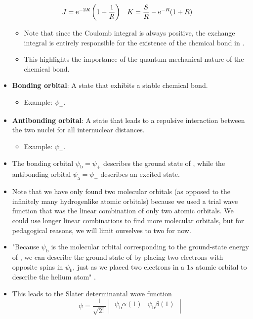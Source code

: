 \documentclass[../notes.tex]{subfiles}
\begin{document}
\begin{itemize}
\begin{align*}
        J &= \e[-2R]\left( 1+\frac{1}{R} \right)&
        K &= \frac{S}{R}-\e[-R](1+R)
    \end{align*}
    \begin{itemize}
        \item Note that since the Coulomb integral is always positive, the exchange integral is entirely responsible for the existence of the chemical bond in .
        \item This highlights the importance of the quantum-mechanical nature of the chemical bond.
    \end{itemize}
    \item \textbf{Bonding orbital}: A state that exhibits a stable chemical bond.
    \begin{itemize}
        \item Example: $\psi_+$.
    \end{itemize}
    \item \textbf{Antibonding orbital}: A state that leads to a repulsive interaction between the two nuclei for all internuclear distances.
    \begin{itemize}
        \item Example: $\psi_-$.
    \end{itemize}
    \item The bonding orbital $\psi_\text{b}=\psi_+$ describes the ground state of , while the antibonding orbital $\psi_\text{a}=\psi_-$ describes an excited state.
    \item Note that we have only found two molecular orbitals (as opposed to the infinitely many hydrogenlike atomic orbitals) because we used a trial wave function that was the linear combination of only two atomic orbitals. We could use longer linear combinations to find more molecular orbitals, but for pedagogical reasons, we will limit ourselves to two for now.
    \item "Because $\psi_\text{b}$ is the molecular orbital corresponding to the ground-state energy of , we can describe the ground state of  by placing two electrons with opposite spins in $\psi_\text{b}$, just as we placed two electrons in a $1s$ atomic orbital to describe the helium atom" \parencite[336]{bib:McQuarrieSimon}.
    \item This leads to the Slater determinantal wave function
    \begin{equation*}
        \psi = \frac{1}{\sqrt{2!}}
        \begin{vmatrix}
            \psi_\text{b}\alpha(1) & \psi_\text{b}\beta(1)\\

\end{vmatrix}
\end{equation*}
\end{itemize}
\end{document}
